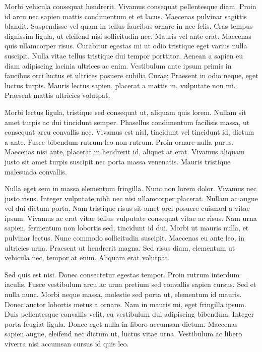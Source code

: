 \documentclass[11pt]{iopart}
\begin{document}
Morbi vehicula consequat hendrerit. Vivamus consequat pellentesque diam. Proin id arcu nec sapien mattis condimentum et et lacus. Maecenas pulvinar sagittis blandit. Suspendisse vel quam in tellus faucibus ornare in nec felis. Cras tempus dignissim ligula, ut eleifend nisi sollicitudin nec. Mauris vel ante erat. Maecenas quis ullamcorper risus. Curabitur egestas mi ut odio tristique eget varius nulla suscipit. Nulla vitae tellus tristique dui tempor porttitor. Aenean a sapien eu diam adipiscing lacinia ultrices ac enim. Vestibulum ante ipsum primis in faucibus orci luctus et ultrices posuere cubilia Curae; Praesent in odio neque, eget luctus turpis. Mauris lectus sapien, placerat a mattis in, vulputate non mi. Praesent mattis ultricies volutpat.

Morbi lectus ligula, tristique sed consequat ut, aliquam quis lorem. Nullam sit amet turpis ac dui tincidunt semper. Phasellus condimentum facilisis massa, ut consequat arcu convallis nec. Vivamus est nisl, tincidunt vel tincidunt id, dictum a ante. Fusce bibendum rutrum leo non rutrum. Proin ornare nulla purus. Maecenas nisi ante, placerat in hendrerit id, aliquet at erat. Vivamus aliquam justo sit amet turpis suscipit nec porta massa venenatis. Mauris tristique malesuada convallis.

Nulla eget sem in massa elementum fringilla. Nunc non lorem dolor. Vivamus nec justo risus. Integer vulputate nibh nec nisi ullamcorper placerat. Nullam ac augue vel dui dictum porta. Nam tristique risus sit amet orci posuere euismod a vitae ipsum. Vivamus ac erat vitae tellus vulputate consequat vitae ac risus. Nam urna sapien, fermentum non lobortis sed, tincidunt id dui. Morbi ut mauris nulla, et pulvinar lectus. Nunc commodo sollicitudin suscipit. Maecenas eu ante leo, in ultricies urna. Praesent ut hendrerit magna. Sed risus diam, elementum ut vehicula nec, tempor at enim. Aliquam erat volutpat.

Sed quis est nisi. Donec consectetur egestas tempor. Proin rutrum interdum iaculis. Fusce vestibulum arcu ac urna pretium sed convallis sapien cursus. Sed et nulla nunc. Morbi neque massa, molestie sed porta ut, elementum id mauris. Donec auctor lobortis metus a ornare. Nam in mauris mi, eget fringilla ipsum. Duis pellentesque convallis velit, eu vestibulum dui adipiscing bibendum. Integer porta feugiat ligula. Donec eget nulla in libero accumsan dictum. Maecenas sapien augue, eleifend nec dictum ut, luctus vitae urna. Vestibulum ac libero viverra nisi accumsan cursus id quis leo.
\end{document}
